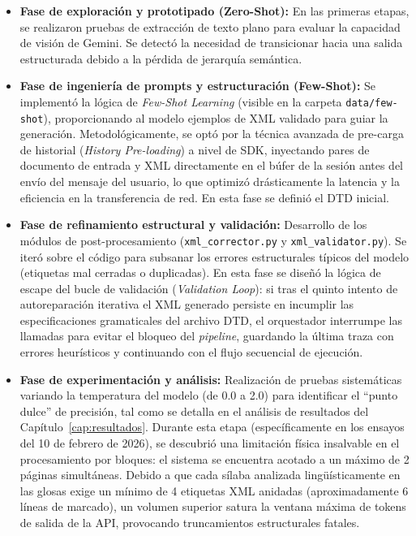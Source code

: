 \begin{itemize}
    \item \textbf{Fase de exploración y prototipado (Zero-Shot):} En las primeras etapas, se realizaron pruebas de extracción de texto plano para evaluar la capacidad de visión de Gemini. Se detectó la necesidad de transicionar hacia una salida estructurada debido a la pérdida de jerarquía semántica.
    
    \item \textbf{Fase de ingeniería de prompts y estructuración (Few-Shot):} Se implementó la lógica de \textit{Few-Shot Learning} (visible en la carpeta \texttt{data/few-shot}), proporcionando al modelo ejemplos de XML validado para guiar la generación. Metodológicamente, se optó por la técnica avanzada de pre-carga de historial (\textit{History Pre-loading}) a nivel de SDK, inyectando pares de documento de entrada y XML directamente en el búfer de la sesión antes del envío del mensaje del usuario, lo que optimizó drásticamente la latencia y la eficiencia en la transferencia de red. En esta fase se definió el DTD inicial.
    
    \item \textbf{Fase de refinamiento estructural y validación:} Desarrollo de los módulos de post-procesamiento (\texttt{xml\_corrector.py} y \texttt{xml\_validator.py}). Se iteró sobre el código para subsanar los errores estructurales típicos del modelo (etiquetas mal cerradas o duplicadas). En esta fase se diseñó la lógica de escape del bucle de validación (\textit{Validation Loop}): si tras el quinto intento de autoreparación iterativa el XML generado persiste en incumplir las especificaciones gramaticales del archivo DTD, el orquestador interrumpe las llamadas para evitar el bloqueo del \textit{pipeline}, guardando la última traza con errores heurísticos y continuando con el flujo secuencial de ejecución.
    
    \item \textbf{Fase de experimentación y análisis:} Realización de pruebas sistemáticas variando la temperatura del modelo (de 0.0 a 2.0) para identificar el ``punto dulce'' de precisión, tal como se detalla en el análisis de resultados del Capítulo~\ref{cap:resultados}. Durante esta etapa (específicamente en los ensayos del 10 de febrero de 2026), se descubrió una limitación física insalvable en el procesamiento por bloques: el sistema se encuentra acotado a un máximo de 2 páginas simultáneas. Debido a que cada sílaba analizada lingüísticamente en las glosas exige un mínimo de 4 etiquetas XML anidadas (aproximadamente 6 líneas de marcado), un volumen superior satura la ventana máxima de tokens de salida de la API, provocando truncamientos estructurales fatales.
\end{itemize}

